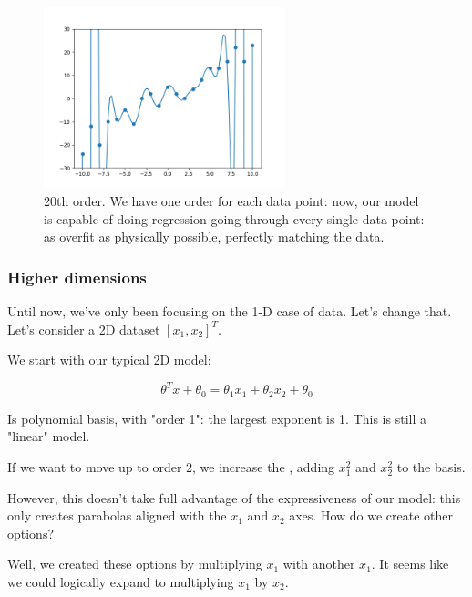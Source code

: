                  \begin{figure}[H]
                    \centering
                    
                    \includegraphics[width=70mm,scale=0.5]{images/feature_images/order_20_soln.png}
                    \caption*{20th order. We have one order for each data point: now, our model is capable of doing regression going through every single data point: as overfit as physically possible, perfectly matching the data.}
                \end{figure}

            \subsecdiv
            \subsubsection{Higher dimensions}

                Until now, we've only been focusing on the 1-D case of data. Let's change that. Let's consider a 2D dataset $[x_1,x_2]^T$.

                We start with our typical 2D model:

                \begin{equation}
                    \theta^Tx + \theta_0 = \theta_1x_1 + \theta_2x_2 + \theta_0
                \end{equation}

                Is polynomial basis, with "order 1": the largest exponent is 1. This is still a "linear" model.

                \subsecdiv

                If we want to move up to order 2, we increase the , adding $x_1^2$ and $x_2^2$ to the basis.

                However, this doesn't take full advantage of the expressiveness of our model: this only creates parabolas aligned with the $x_1$ and $x_2$ axes. How do we create other options?

                Well, we created these options by multiplying $x_1$ with another $x_1$. It seems like we could logically expand to multiplying $x_1$ by $x_2$.\\

